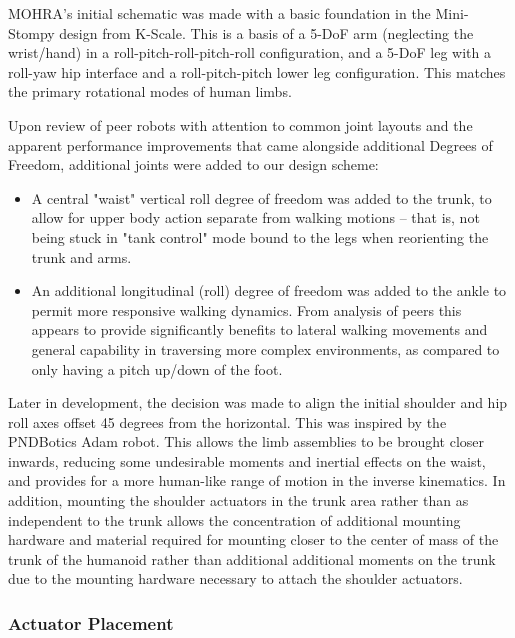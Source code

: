 \documentclass{article}
\begin{document}
MOHRA's initial schematic was made with a basic foundation in the Mini-Stompy design from K-Scale. This is a basis of a 5-DoF arm (neglecting the wrist/hand) in a roll-pitch-roll-pitch-roll configuration, and a 5-DoF leg with a roll-yaw hip interface and a roll-pitch-pitch lower leg configuration. This matches the primary rotational modes of human limbs. 

Upon review of peer robots with attention to common joint layouts and the apparent performance improvements that came alongside additional Degrees of Freedom, additional joints were added to our design scheme:

 \begin{itemize}
     \item A central "waist" vertical roll degree of freedom was added to the trunk, to allow for upper body action separate from walking motions -- that is, not being stuck in "tank control" mode bound to the legs when reorienting the trunk and arms.

    \item An additional longitudinal (roll) degree of freedom was added to the ankle to permit more responsive walking dynamics. From analysis of peers
    \cite{pndboticsAdam} \cite{pndbotics_adam_vid_2024}
    this appears to provide significantly benefits to lateral walking movements and general capability in traversing more complex environments, as compared to only having a pitch up/down of the foot. 
 \end{itemize}

Later in development, the decision was made to align the initial shoulder and hip roll axes offset 45 degrees from the horizontal. This was inspired by the PNDBotics Adam robot. This allows the limb assemblies to be brought closer inwards, reducing some undesirable moments and inertial effects on the waist, and provides for a more human-like range of motion in the inverse kinematics. In addition, mounting the shoulder actuators in the trunk area rather than as independent to the trunk allows the concentration of additional mounting hardware and material required for mounting closer to the center of mass of the trunk of the humanoid rather than additional additional moments on the trunk due to the mounting hardware necessary to attach the shoulder actuators. 


\subsubsection{Actuator Placement}
\end{document}

